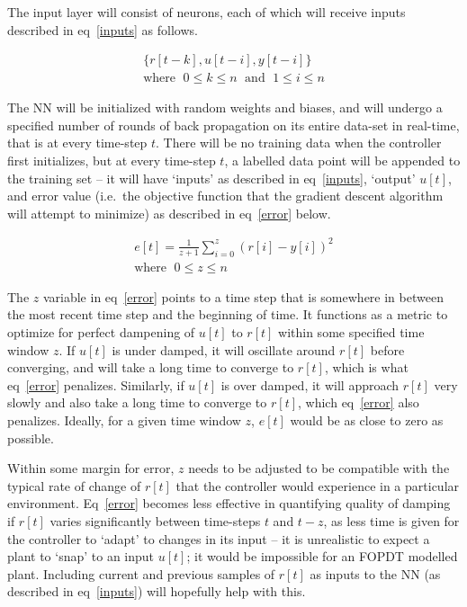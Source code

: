 \documentclass[10pt,twocolumn,letterpaper]{article}
\begin{document}
        The input layer will consist of neurons, each of which will receive inputs described in eq~\ref{inputs} as
        follows.

        \begin{equation} \label{inputs}
            \begin{gathered}
                \{r[t-k], u[t-i], y[t-i]\} \\
                \text{where } \; 0 \leq k \leq n \; \text{ and } \; 1 \leq i \leq n
            \end{gathered}
        \end{equation}

        The NN will be initialized with random weights and biases, and will undergo a specified number of rounds of back
        propagation on its entire data-set in real-time, that is at every time-step $t$. There will be no training data
        when the controller first initializes, but at every time-step $t$, a labelled data point will be appended to the
        training set -- it will have `inputs' as described in eq~\ref{inputs}, `output' $u[t]$, and error value (i.e.\
        the objective function that the gradient descent algorithm will attempt to minimize) as described in
        eq~\ref{error} below.

        \begin{equation} \label{error}
            \begin{gathered}
                e[t] = \frac{1}{z+1} \sum_{i=0}^{z} \left(r[i] - y[i]\right)^2 \\
                \text{where } \; 0 \leq z \leq n
            \end{gathered}
        \end{equation}

        The $z$ variable in eq~\ref{error} points to a time step that is somewhere in between the most recent time step
        and the beginning of time. It functions as a metric to optimize for perfect dampening of $u[t]$ to $r[t]$ within
        some specified time window $z$. If $u[t]$ is under damped, it will oscillate around $r[t]$ before converging,
        and will take a long time to converge to $r[t]$, which is what eq~\ref{error} penalizes. Similarly, if $u[t]$ is
        over damped, it will approach $r[t]$ very slowly and also take a long time to converge to $r[t]$, which
        eq~\ref{error} also penalizes. Ideally, for a given time window $z$, $e[t]$ would be as close to zero as
        possible. 
        
        Within some margin for error, $z$ needs to be adjusted to be compatible with the typical rate of change of
        $r[t]$ that the controller would experience in a particular environment. Eq~\ref{error} becomes less effective
        in quantifying quality of damping if $r[t]$ varies significantly between time-steps $t$ and $t-z$, as less time
        is given for the controller to `adapt' to changes in its input -- it is unrealistic to expect a plant to `snap'
        to an input $u[t]$; it would be impossible for an FOPDT modelled plant. Including current and previous samples
        of $r[t]$ as inputs to the NN (as described in eq~\ref{inputs}) will hopefully help with this.
\end{document}
